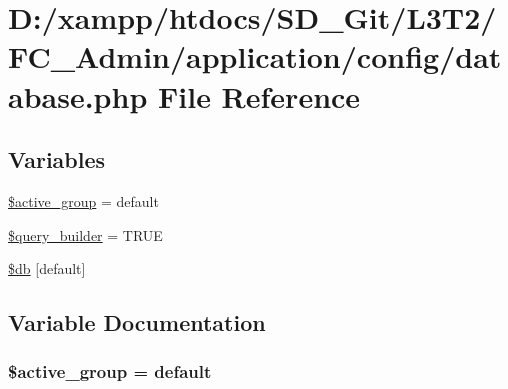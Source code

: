 \hypertarget{_admin_2application_2config_2database_8php}{}\section{D\+:/xampp/htdocs/\+S\+D\+\_\+\+Git/\+L3\+T2/\+F\+C\+\_\+\+Admin/application/config/database.php File Reference}
\label{_admin_2application_2config_2database_8php}
\subsection*{Variables}
\begin{DoxyCompactItemize}
\item 
\hyperlink{_admin_2application_2config_2database_8php_a5046ea83a698c5b7bbf6ffd3dd816b65}{\$active\+\_\+group} = \textquotesingle{}default\textquotesingle{}
\item 
\hyperlink{_admin_2application_2config_2database_8php_a11d000bc34a3940bb236487b672328bf}{\$query\+\_\+builder} = T\+R\+U\+E
\item 
\hyperlink{_admin_2application_2config_2database_8php_ad0fb5aa377966ebea235874ccab61f40}{\$db} \mbox{[}\textquotesingle{}default\textquotesingle{}\mbox{]}
\end{DoxyCompactItemize}


\subsection{Variable Documentation}
\hypertarget{_admin_2application_2config_2database_8php_a5046ea83a698c5b7bbf6ffd3dd816b65}{}
\subsubsection[{\$active\+\_\+group}]{\setlength{\rightskip}{0pt plus 5cm}\$active\+\_\+group = \textquotesingle{}default\textquotesingle{}}\label{_admin_2application_2config_2database_8php_a5046ea83a698c5b7bbf6ffd3dd816b65}
\hypertarget{_admin_2application_2config_2database_8php_ad0fb5aa377966ebea235874ccab61f40}{}
